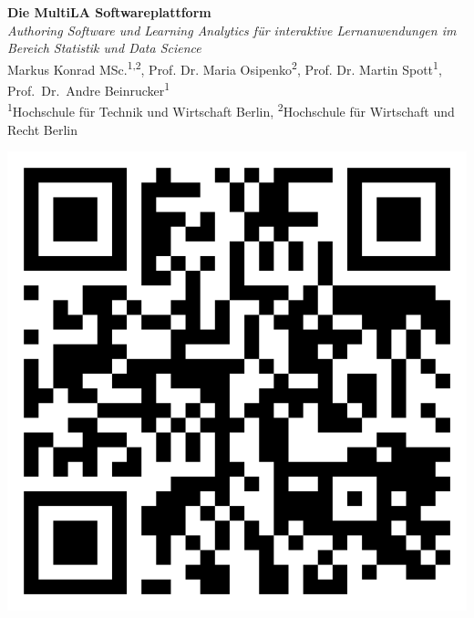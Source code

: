 \documentclass[a0,portrait]{a0poster}
\begin{document}


\begin{minipage}[b]{0.75\linewidth}
\veryHuge \color{NavyBlue} \textbf{Die MultiLA Softwareplattform} \color{Black}\\ %
\Huge\textit{Authoring Software und Learning Analytics für interaktive \mbox{Lernanwendungen} im Bereich Statistik und Data Science}\\[2cm] %
\huge Markus Konrad MSc.\textsuperscript{1,2},
Prof. Dr. Maria Osipenko\textsuperscript{2},
Prof. Dr. Martin Spott\textsuperscript{1},
Prof.~Dr.~Andre Beinrucker\textsuperscript{1}\\[0.5cm] %
\large \textsuperscript{1}Hochschule für Technik und Wirtschaft Berlin, \textsuperscript{2}Hochschule für Wirtschaft und Recht Berlin\\[0.4cm] %
\end{minipage}
%
\begin{minipage}[b]{0.25\linewidth}
\includegraphics[width=15cm,right]{qrcode.png}\\
\end{minipage}
\end{document}
